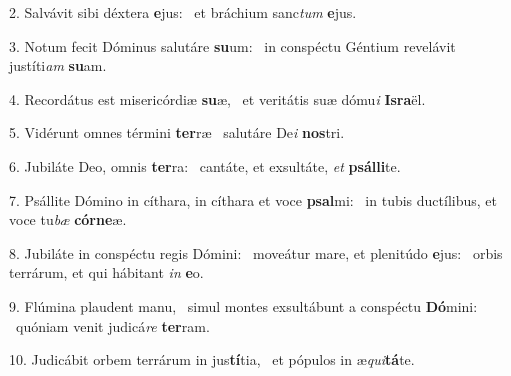 2. Salvávit sibi déxtera \textbf{e}jus: \ast\  et bráchium sanc\textit{tum} \textbf{e}jus.\

3. Notum fecit Dóminus salutáre \textbf{su}um: \ast\  in conspéctu Géntium revelávit justíti\textit{am} \textbf{su}am.\

4. Recordátus est misericórdiæ \textbf{su}æ, \ast\  et veritátis suæ dómu\textit{i} \textbf{Is}\textbf{ra}ël.\

5. Vidérunt omnes términi \textbf{ter}ræ \ast\  salutáre De\textit{i} \textbf{nos}tri.\

6. Jubiláte Deo, omnis \textbf{ter}ra: \ast\  cantáte, et exsultáte, \textit{et} \textbf{psál}\textbf{li}te.\

7. Psállite Dómino in cíthara, in cíthara et voce \textbf{psal}mi: \ast\  in tubis ductílibus, et voce tu\textit{bæ} \textbf{cór}\textbf{ne}æ.\

8. Jubiláte in conspéctu regis Dómini: \dag\  moveátur mare, et plenitúdo \textbf{e}jus: \ast\  orbis terrárum, et qui hábitant \textit{in} \textbf{e}o.\

9. Flúmina plaudent manu, \dag\  simul montes exsultábunt a conspéctu \textbf{Dó}mini: \ast\  quóniam venit judicá\textit{re} \textbf{ter}ram.\

10. Judicábit orbem terrárum in jus\textbf{tí}tia, \ast\  et pópulos in æ\textit{qui}\textbf{tá}te.\


